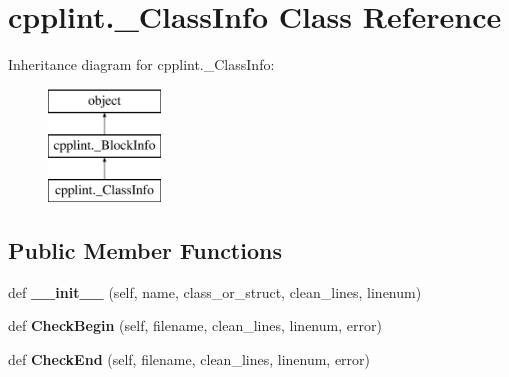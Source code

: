 \hypertarget{classcpplint_1_1__ClassInfo}{}\section{cpplint.\+\_\+\+Class\+Info Class Reference}
\label{classcpplint_1_1__ClassInfo}
Inheritance diagram for cpplint.\+\_\+\+Class\+Info\+:\begin{figure}[H]
\begin{center}
\leavevmode
\includegraphics[height=3.000000cm]{classcpplint_1_1__ClassInfo}
\end{center}
\end{figure}
\subsection*{Public Member Functions}
\begin{DoxyCompactItemize}
\item 
def {\bfseries \+\_\+\+\_\+init\+\_\+\+\_\+} (self, name, class\+\_\+or\+\_\+struct, clean\+\_\+lines, linenum)\hypertarget{classcpplint_1_1__ClassInfo_a549b13e77acbe712f79a2d2b2c98ff7d}{}\label{classcpplint_1_1__ClassInfo_a549b13e77acbe712f79a2d2b2c98ff7d}

\item 
def {\bfseries Check\+Begin} (self, filename, clean\+\_\+lines, linenum, error)\hypertarget{classcpplint_1_1__ClassInfo_abed47237f2e7416ca51cb220cfad6c1b}{}\label{classcpplint_1_1__ClassInfo_abed47237f2e7416ca51cb220cfad6c1b}

\item 
def {\bfseries Check\+End} (self, filename, clean\+\_\+lines, linenum, error)\hypertarget{classcpplint_1_1__ClassInfo_a8a61461a72928bc6ce62a9b75b770fec}{}\label{classcpplint_1_1__ClassInfo_a8a61461a72928bc6ce62a9b75b770fec}

\end{DoxyCompactItemize}
